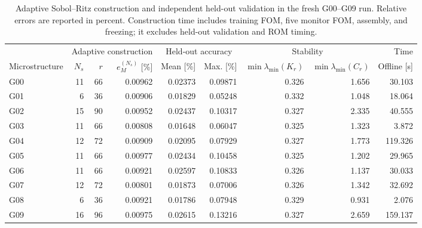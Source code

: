 \begin{table}[t]
\centering
\caption{Adaptive Sobol--Ritz construction and independent held-out validation in the fresh G00--G09 run. Relative errors are reported in percent. Construction time includes training FOM, five monitor FOM, assembly, and freezing; it excludes held-out validation and ROM timing.}
\label{tab:adaptive_accuracy_run01}
\small
\setlength{\tabcolsep}{3.5pt}
\begin{tabular}{@{}lrrrrrrrr@{}}
\toprule
& \multicolumn{3}{c}{Adaptive construction} & \multicolumn{2}{c}{Held-out accuracy} & \multicolumn{2}{c}{Stability} & Time \\
\cmidrule(lr){2-4}\cmidrule(lr){5-6}\cmidrule(lr){7-8}
Microstructure & \(N_s\) & \(r\) & \(e_M^{(N_s)}\) [\%] & Mean [\%] & Max. [\%] & \(\min\lambda_{\min}(K_r)\) & \(\min\lambda_{\min}(C_r)\) & Offline [s] \\
\midrule
G00 & 11 & 66 & 0.00962 & 0.02373 & 0.09871 & 0.326 & 1.656 & 30.103 \\
G01 & 6 & 36 & 0.00906 & 0.01829 & 0.05248 & 0.332 & 1.048 & 18.064 \\
G02 & 15 & 90 & 0.00952 & 0.02437 & 0.10317 & 0.327 & 2.335 & 40.555 \\
G03 & 11 & 66 & 0.00808 & 0.01648 & 0.06047 & 0.325 & 1.323 & 3.872 \\
G04 & 12 & 72 & 0.00909 & 0.02095 & 0.07929 & 0.327 & 1.773 & 119.326 \\
G05 & 11 & 66 & 0.00977 & 0.02434 & 0.10458 & 0.325 & 1.202 & 29.965 \\
G06 & 11 & 66 & 0.00921 & 0.02597 & 0.10833 & 0.326 & 1.137 & 30.033 \\
G07 & 12 & 72 & 0.00801 & 0.01873 & 0.07006 & 0.326 & 1.342 & 32.692 \\
G08 & 6 & 36 & 0.00921 & 0.01786 & 0.07948 & 0.329 & 0.931 & 2.076 \\
G09 & 16 & 96 & 0.00975 & 0.02615 & 0.13216 & 0.327 & 2.659 & 159.137 \\
\bottomrule
\end{tabular}
\end{table}
